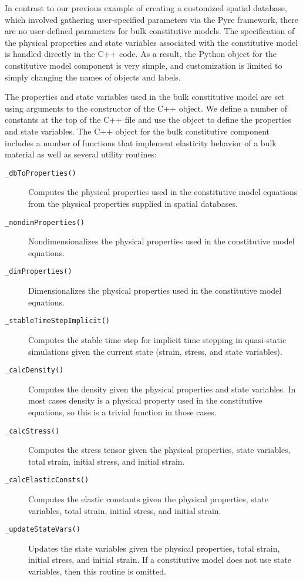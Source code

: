 In contrast to our previous example of creating a customized spatial
database, which involved gathering user-specified parameters via the
Pyre framework, there are no user-defined parameters for bulk
constitutive models. The specification of the physical properties and
state variables associated with the constitutive model is handled
directly in the C++ code. As a result, the Python object for the
constitutive model component is very simple, and customization is
limited to simply changing the names of objects and labels.

The properties and state variables used in the bulk constitutive model
are set using arguments to the constructor of the C++ 
object. We define a number of constants at the top of the C++ file
and use the  object to define the properties and
state variables. The C++ object for the bulk constitutive component
includes a number of functions that implement elasticity behavior
of a bulk material as well as several utility routines:
\begin{description}
\item [{\texttt{\_dbToProperties()}}] Computes the physical properties
  used in the constitutive model equations from the physical properties
  supplied in spatial databases.
\item [{\texttt{\_nondimProperties()}}] Nondimensionalizes the physical
  properties used in the constitutive model equations.
\item [{\texttt{\_dimProperties()}}] Dimensionalizes the physical properties
  used in the constitutive model equations.
\item [{\texttt{\_stableTimeStepImplicit()}}] Computes the stable time
  step for implicit time stepping in quasi-static simulations given
  the current state (strain, stress, and state variables).
\item [{\texttt{\_calcDensity()}}] Computes the density given the physical
  properties and state variables. In most cases density is a physical
  property used in the constitutive equations, so this is a trivial
  function in those cases.
\item [{\texttt{\_calcStress()}}] Computes the stress tensor given the
  physical properties, state variables, total strain, initial stress,
  and initial strain.
\item [{\texttt{\_calcElasticConsts()}}] Computes the elastic constants
  given the physical properties, state variables, total strain, initial
  stress, and initial strain.
\item [{\texttt{\_updateStateVars()}}] Updates the state variables given
  the physical properties, total strain, initial stress, and initial
  strain. If a constitutive model does not use state variables, then
  this routine is omitted.
\end{description}
